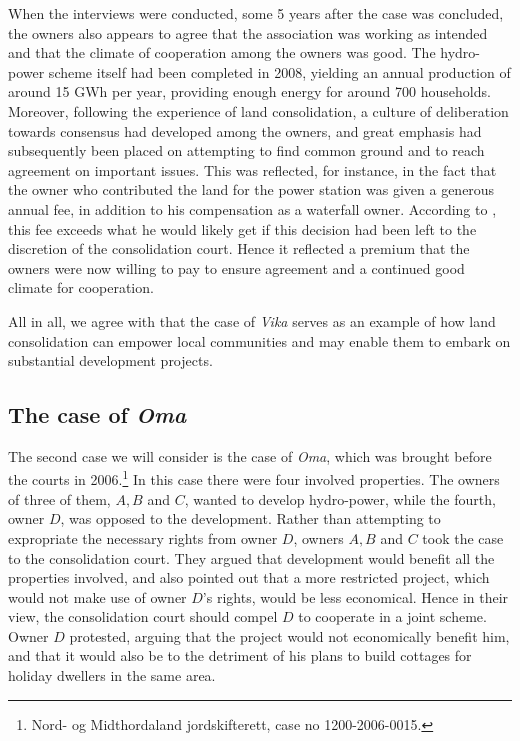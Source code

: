 \documentclass[10pt]{article} %
\begin{document}
When the interviews were conducted, some 5 years after the case was concluded, the owners also appears to agree that the association was working as intended and that the climate of cooperation among the owners was good. The hydro-power scheme itself had been completed in 2008, yielding an annual production of around 15 GWh per year, providing enough energy for around 700 households. Moreover, following the experience of land consolidation, a culture of deliberation towards consensus had developed among the owners, and great emphasis had subsequently been placed on attempting to find common ground and to reach agreement on important issues. This was reflected, for instance, in the fact that the owner who contributed the land for the power station was given a generous annual fee, in addition to his compensation as a waterfall owner. According to \cite{master}, this fee exceeds what he would likely get if this decision had been left to the discretion of the consolidation court. Hence it reflected a premium that the owners were now willing to pay to ensure agreement and a continued good climate for cooperation.

All in all, we agree with \cite{master} that the case of \emph{Vika} serves as an example of how land consolidation can empower local communities and may enable them to embark on substantial development projects.

\subsection{The case of \emph{Oma}}

The second case we will consider is the case of \emph{Oma}, which was brought before the courts in 2006.\footnote{Nord- og Midthordaland jordskifterett, case no 1200-2006-0015.} In this case there were four involved properties. The owners of three of them, $A,B$ and $C$, wanted to develop hydro-power, while the fourth, owner $D$, was opposed to the development. Rather than attempting to expropriate the necessary rights from owner $D$, owners $A,B$ and $C$ took the case to the consolidation court. They argued that development would benefit all the properties involved, and also pointed out that a more restricted project, which would not make use of owner $D$'s rights, would be less economical. Hence in their view, the consolidation court should compel $D$ to cooperate in a joint scheme. Owner $D$ protested, arguing that the project would not economically benefit him, and that it would also be to the detriment of his plans to build cottages for holiday dwellers in the same area.
\end{document}
